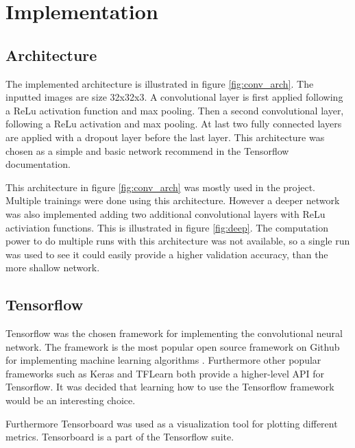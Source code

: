 \chapter{Implementation}
\label{chp:imp}

\section{Architecture}
The implemented architecture is illustrated in figure \ref{fig:conv_arch}. The inputted images are size 32x32x3. A convolutional layer is first applied following a ReLu activation function and max pooling. Then a second convolutional layer, following a ReLu activation and max pooling. At last two fully connected layers are applied with a dropout layer before the last layer. This architecture was chosen as a simple and basic network recommend in the Tensorflow documentation.


This architecture in figure \ref{fig:conv_arch} was mostly used in the project. Multiple trainings were done using this architecture. However a deeper network was also implemented adding two additional convolutional layers with ReLu activiation functions. This is illustrated in figure \ref{fig:deep}. The computation power to do multiple runs with this architecture was not available, so a single run was used to see it could easily provide a higher validation accuracy, than the more shallow network.




\section{Tensorflow}
Tensorflow was the chosen framework for implementing the convolutional neural network. The framework is the most popular open source framework on Github for implementing machine learning algorithms \citep{ML_frameworks}. Furthermore other popular frameworks such as Keras and TFLearn both provide a higher-level API for Tensorflow. It was decided that learning how to use the Tensorflow framework would be an interesting choice.

Furthermore Tensorboard was used as a visualization tool for plotting different metrics. Tensorboard is a part of the Tensorflow suite.

